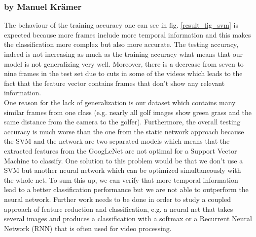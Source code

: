 \documentclass[11pt]{report}
\begin{document}
\subsubsection{by Manuel Krämer}
The behaviour of the training accuracy one can see in fig. \ref{result_fig_svm} is expected because more frames include more temporal information and this makes the classification more complex but also more accurate. The testing accuracy, indeed is not increasing as much as the training accuracy what means that our model is not generalizing very well. Moreover, there is a decrease from seven to nine frames in the test set due to cuts in some of the videos which leads to the fact that the feature vector contains frames that don't show any relevant information. \\
One reason for the lack of generalization is our dataset which contains many similar frames from one class (e.g. nearly all golf images show green grass and the same distance from the camera to the golfer). Furthermore, the overall testing accuracy is much worse than the one from the static network approach because the SVM and the network are two separated models which means that the extracted features from the GoogLeNet are not optimal for a Support Vector Machine to classify. One solution to this problem would be that we don't use a SVM but another neural network which can be optimized simultaneously with the whole net.
To sum this up, we can verify that more temporal information lead to a better classification performance but we are not able to outperform the neural network. Further work needs to be done in order to study a coupled approach of feature reduction and classification, e.g. a neural net that takes several images and produces a classification with a softmax or a Recurrent Neural Network (RNN) that is often used for video processing.



\end{document}
